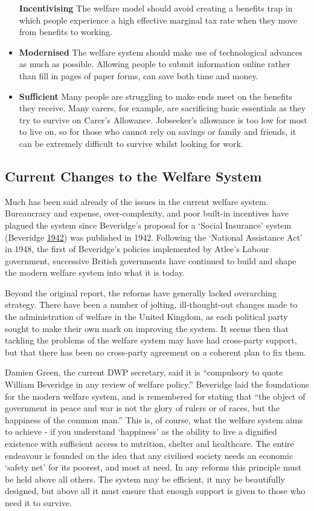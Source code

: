 \documentclass[]{tufte-handout}
\begin{document}
\begin{itemize}
  \textbf{Incentivising} The welfare model should avoid creating a
  benefits trap in which people experience a high effective marginal tax
  rate when they move from benefits to working.
\item
  \textbf{Modernised} The welfare system should make use of
  technological advances as much as possible. Allowing people to submit
  information online rather than fill in pages of paper forms, can save
  both time and money.
\item
  \textbf{Sufficient} Many people are struggling to make ends meet on
  the benefits they receive. Many carers, for example, are sacrificing
  basic essentials as they try to survive on Carer's Allowance.
  Jobseeker's allowance is too low for most to live on, so for those who
  cannot rely on savings or family and friends, it can be extremely
  difficult to survive whilst looking for work.
\end{itemize}

\hypertarget{current-changes-to-the-welfare-system}{%
\subsection{Current Changes to the Welfare
System}\label{current-changes-to-the-welfare-system}}

Much has been said already of the issues in the current welfare system.
Bureaucracy and expense, over-complexity, and poor built-in incentives
have plagued the system since Beveridge's proposal for a `Social
Insurance' system (Beveridge
\protect\hyperlink{ref-Beveridge1942}{1942}) was published in 1942.
Following the `National Assistance Act' in 1948, the first of
Beveridge's policies implemented by Atlee's Labour government,
successive British governments have continued to build and shape the
modern welfare system into what it is today.

Beyond the original report, the reforms have generally lacked
overarching strategy. There have been a number of jolting,
ill-thought-out changes made to the administration of welfare in the
United Kingdom, as each political party sought to make their own mark on
improving the system. It seems then that tackling the problems of the
welfare system may have had cross-party support, but that there has been
no cross-party agreement on a coherent plan to fix them.

Damien Green, the current DWP secretary, said it is ``compulsory to
quote William Beveridge in any review of welfare policy.'' Beveridge
laid the foundations for the modern welfare system, and is remembered
for stating that ``the object of government in peace and war is not the
glory of rulers or of races, but the happiness of the common man.'' This
is, of course, what the welfare system aims to achieve - if you
understand `happiness' as the ability to live a dignified existence with
sufficient access to nutrition, shelter and healthcare. The entire
endeavour is founded on the idea that any civilised society needs an
economic `safety net' for its poorest, and most at need. In any reforms
this principle must be held above all others. The system may be
efficient, it may be beautifully designed, but above all it must ensure
that enough support is given to those who need it to survive.
\end{document}
